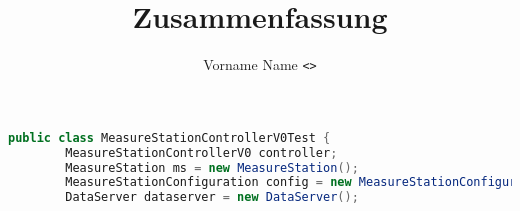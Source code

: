 \documentclass[header, margin=big]{hsrzf}
\date{\thesemester}
\title{\textsl{\themodule} Zusammenfassung}
\author{Vorname Name \texttt{<\theauthoremail>}}
\begin{document}
\maketitle

\blinddocument

\begin{lstlisting}[language=java]
public class MeasureStationControllerV0Test {
        MeasureStationControllerV0 controller;
        MeasureStation ms = new MeasureStation();
        MeasureStationConfiguration config = new MeasureStationConfiguration();
        DataServer dataserver = new DataServer();
\end{lstlisting}
\end{document}
